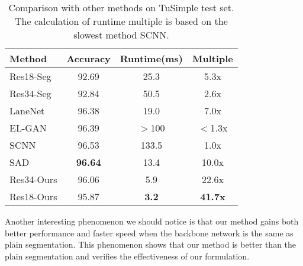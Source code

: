 \documentclass[runningheads]{llncs}
\begin{document}
\begin{table}[h]
	\vspace{-10pt}
	\centering
	\caption{Comparison with other methods on TuSimple test set. The calculation of runtime multiple is based on the slowest method SCNN.}
	\label{tab:Tusimple compare}
	\begin{tabular}{lccc}
		\toprule
		Method  & Accuracy & Runtime(ms) & Multiple \\ \midrule
		Res18-Seg \cite{chen2017deeplab}& 92.69    & 25.3        &   5.3x       \\
		Res34-Seg \cite{chen2017deeplab} & 92.84    & 50.5        &   2.6x      \\
		LaneNet \cite{End-to-End}  & 96.38    & 19.0        &   7.0x      \\
		EL-GAN \cite{ghafoorian2018gan}    & 96.39    & $>$100        &   $<$1.3x   \\
		SCNN \cite{SCNN}    & 96.53    & 133.5       &   1.0x       \\
		SAD \cite{SAD}      & \textbf{96.64}    & 13.4        &   10.0x     \\
\midrule
		Res34-Ours      & 96.06    & 5.9        &   22.6x     \\ 
		Res18-Ours      & 95.87    & \textbf{3.2}         &   \textbf{41.7x}     \\ 
		
		\bottomrule
	\end{tabular}
	\vspace{-10pt}
\end{table}



Another interesting phenomenon we should notice is that our method gains both better performance and faster speed when the backbone network is the same as plain segmentation. This phenomenon shows that our method is better than the plain segmentation and verifies the effectiveness of our formulation.
\end{document}
